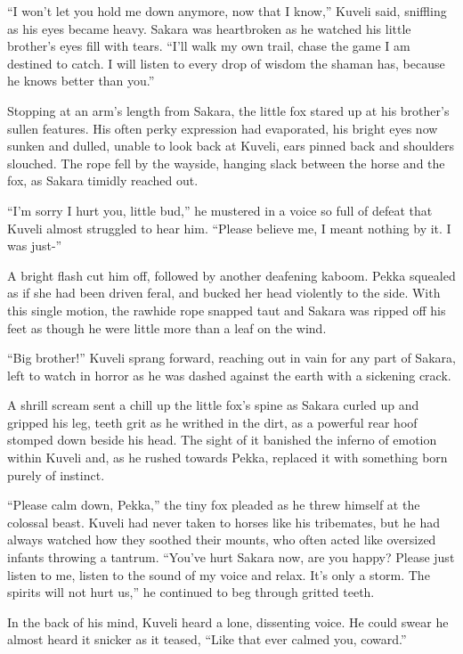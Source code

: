 ``I won't let you hold me down anymore, now that I know,'' Kuveli said, sniffling as his eyes became heavy. Sakara was heartbroken as he watched his little brother's eyes fill with tears. ``I'll walk my own trail, chase the game I am destined to catch. I will listen to every drop of wisdom the shaman has, because he knows better than you.''

Stopping at an arm's length from Sakara, the little fox stared up at his brother's sullen features. His often perky expression had evaporated, his bright eyes now sunken and dulled, unable to look back at Kuveli, ears pinned back and shoulders slouched. The rope fell by the wayside, hanging slack between the horse and the fox, as Sakara timidly reached out.

``I'm sorry I hurt you, little bud,'' he mustered in a voice so full of defeat that Kuveli almost struggled to hear him. ``Please believe me, I meant nothing by it. I was just-''

A bright flash cut him off, followed by another deafening kaboom. Pekka squealed as if she had been driven feral, and bucked her head violently to the side. With this single motion, the rawhide rope snapped taut and Sakara was ripped off his feet as though he were little more than a leaf on the wind.

``Big brother!'' Kuveli sprang forward, reaching out in vain for any part of Sakara, left to watch in horror as he was dashed against the earth with a sickening crack.

A shrill scream sent a chill up the little fox's spine as Sakara curled up and gripped his leg, teeth grit as he writhed in the dirt, as a powerful rear hoof stomped down beside his head. The sight of it banished the inferno of emotion within Kuveli and, as he rushed towards Pekka, replaced it with something born purely of instinct.

``Please calm down, Pekka,'' the tiny fox pleaded as he threw himself at the colossal beast. Kuveli had never taken to horses like his tribemates, but he had always watched how they soothed their mounts, who often acted like oversized infants throwing a tantrum. ``You've hurt Sakara now, are you happy? Please just listen to me, listen to the sound of my voice and relax. It's only a storm. The spirits will not hurt us,'' he continued to beg through gritted teeth.

In the back of his mind, Kuveli heard a lone, dissenting voice. He could swear he almost heard it snicker as it teased, ``Like that ever calmed you, coward.''

